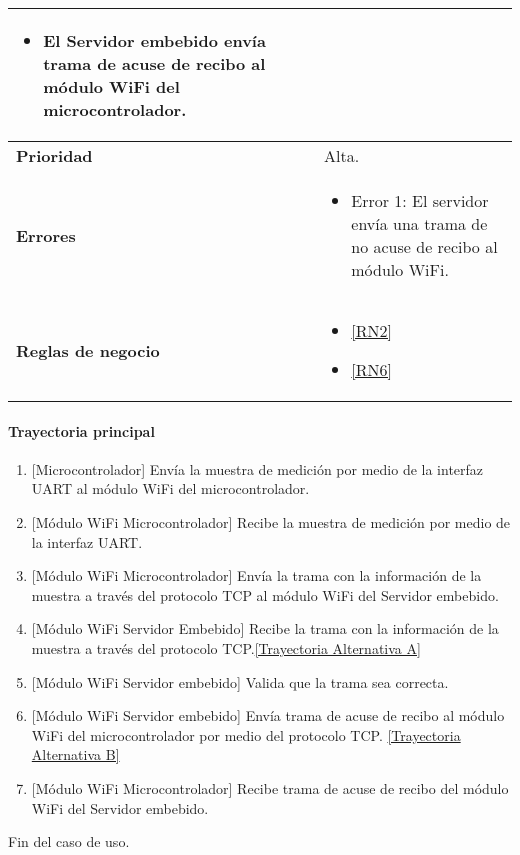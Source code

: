 \begin{longtable}{|J{5cm}|J{10.3cm}|}
		\begin{itemize}
		    \item El Servidor embebido envía trama de acuse de recibo al módulo WiFi del microcontrolador.%
		\end{itemize} 
		\\ \hline 
	\textbf{Prioridad} & 
		Alta. \\ \hline
	\textbf{Errores} &%
		 \begin{itemize}
		 	\item \label{SUB-M-CU1.4:Error1} Error 1: El servidor envía una trama de no acuse de recibo al módulo WiFi.
		 \end{itemize} \\ 
		 \hline
	\textbf{Reglas de negocio} & 
	    \begin{itemize}
	      \item  \ref{RN2}
	      \item  \ref{RN6}
		 \end{itemize}%
		 \hline
\end{longtable}

\paragraph{Trayectoria principal}
\label{SUB-M-CU1.4:TP}
	\begin{enumerate}
	    \item {[Microcontrolador]} Envía la muestra de medición por medio de la interfaz UART al módulo WiFi del microcontrolador.
	    \item {[Módulo WiFi Microcontrolador]} Recibe la muestra de medición por medio de la interfaz UART.
	    \item {[Módulo WiFi Microcontrolador]} Envía la trama con la información de la muestra a través del protocolo TCP al módulo WiFi del Servidor embebido.
	    \item {[Módulo WiFi Servidor Embebido]} Recibe la trama con la información de la muestra a través del protocolo TCP.\hyperref[SUB-M-CU1.4:TA]{[Trayectoria Alternativa A]}
	    \item {[Módulo WiFi Servidor embebido]} Valida que la trama sea correcta. 
	    \item {[Módulo WiFi Servidor embebido]} Envía trama de acuse de recibo al módulo WiFi del microcontrolador por medio del protocolo TCP. \hyperref[SUB-M-CU1.4:TB]{[Trayectoria Alternativa B]}
	    \item {[Módulo WiFi Microcontrolador]} Recibe trama de acuse de recibo del módulo WiFi del Servidor embebido.
	\end{enumerate}
	Fin del caso de uso.


